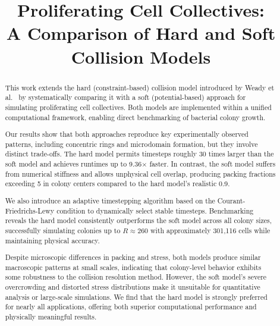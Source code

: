\documentclass[conference]{IEEEtran}
\begin{document}
\title{Proliferating Cell Collectives: \\A Comparison of Hard and Soft Collision Models}

\author{
}

\maketitle

\begin{abstract}
    This work extends the hard (constraint-based) collision model introduced by Weady et al.~\cite{Weady2024} by systematically comparing it with a soft (potential-based) approach for simulating proliferating cell collectives. Both models are implemented within a unified computational framework, enabling direct benchmarking of bacterial colony growth.

    Our results show that both approaches reproduce key experimentally observed patterns, including concentric rings and microdomain formation, but they involve distinct trade-offs. The hard model permits timesteps roughly 30 times larger than the soft model and achieves runtimes up to 9.36$\times$ faster. In contrast, the soft model suffers from numerical stiffness and allows unphysical cell overlap, producing packing fractions exceeding 5 in colony centers compared to the hard model's realistic 0.9.

    We also introduce an adaptive timestepping algorithm based on the Courant-Friedrichs-Lewy condition to dynamically select stable timesteps. Benchmarking reveals the hard model consistently outperforms the soft model across all colony sizes, successfully simulating colonies up to $R \approx 260$ with approximately 301,116 cells while maintaining physical accuracy.

    Despite microscopic differences in packing and stress, both models produce similar macroscopic patterns at small scales, indicating that colony-level behavior exhibits some robustness to the collision resolution method. However, the soft model's severe overcrowding and distorted stress distributions make it unsuitable for quantitative analysis or large-scale simulations. We find that the hard model is strongly preferred for nearly all applications, offering both superior computational performance and physically meaningful results.
\end{abstract}
\end{document}
